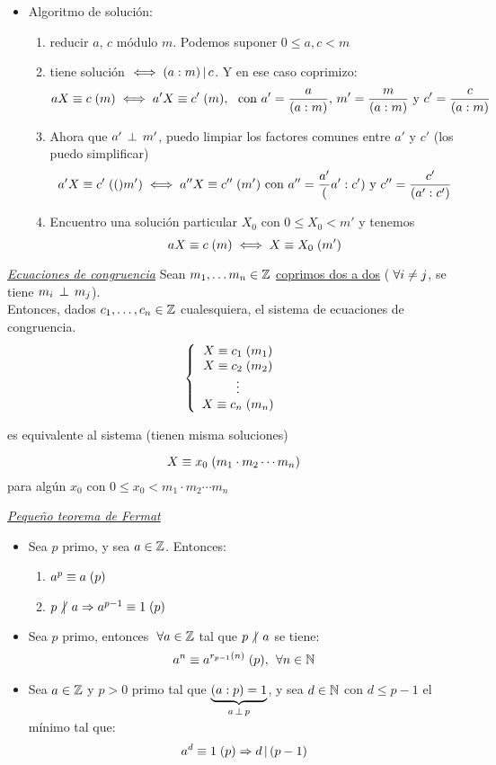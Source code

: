 \begin{itemize}
	\item Algoritmo de solución:
	      \begin{enumerate}[label=\arabic*)]
		      \item reducir $a,\, c$ módulo $m$. Podemos suponer $0 \leq a, c < m$
		      \item tiene solución $\sisolosi (a:m) \divideA c$. Y en ese caso coprimizo:
		            \[
			            \congruencia{aX}{c}{m} \sisolosi \congruencia{a'X}{c'}{m},\ \text{ con } a' = \frac{a}{(a:m)},\, m' = \frac{m}{(a:m)} \text{ y } c' = \frac{c}{(a:m)}
		            \]
		      \item   Ahora que $a' \cop m'$, puedo limpiar los factores comunes entre $a'$ y $c'$ (los puedo simplificar)
		            \[
			            \congruencia{a'X}{c'}(m') \sisolosi \congruencia{a''X}{c''}{m'} \text{ con } a'' = \frac{a'}(a':c') \text{ y } c'' = \frac{c'}{(a':c')}
		            \]
		      \item Encuentro una solución particular $X_0$ con $ 0\leq X_0 < m'$ y tenemos
		            \[
			            \congruencia{aX}{c}{m} \sisolosi \congruencia{X}{X_0}{m'}
		            \]
	      \end{enumerate}

\end{itemize}

\textit\underline{Ecuaciones de congruencia}
Sean $m_1,\dots m_n \en \enteros$ \underline{coprimos dos a dos} ($\paratodo i \distinto j$, se tiene $m_i \cop m_j$). \\
Entonces, dados $c_1,\dots, c_n \en \enteros$ cualesquiera, el sistema de ecuaciones de congruencia.
\[
	\llave{c}{
		\congruencia{X}{c_1}{m_1}\\
		\congruencia{X}{c_2}{m_2}\\
		\vdots\\
		\congruencia{X}{c_n}{m_n}
	}
\]

es equivalente al sistema (tienen misma soluciones)

\[
	\congruencia{X}{x_0}{m_1\cdot m_2 \cdots m_n}
\]
para algún $x_0$ con $0\leq x_0 < m_1\cdot m_2 \cdots m_n$

\textit{\underline{Pequeño teorema de Fermat}}
\begin{itemize}
	\item Sea $p$ primo, y sea $a \en \enteros$. Entonces:
	      \begin{enumerate}[label=\arabic*.)]
		      \item $ \congruencia{a^p}{a}{p} $
		      \item $ p \noDivide a \entonces \congruencia{a^{p-1}}{1}{p} $
	      \end{enumerate}
	\item Sea $p$ primo, entonces $ \paratodo a \en \enteros$ tal que $ p \noDivide a$ se tiene:
	      \[
		      \congruencia{a^n}{a^{r_{p-1}(n)}}{p} ,\, \paratodo n \en \naturales
	      \]
	\item Sea $a \en \enteros$ y $p > 0$ primo tal que $\ub{(a:p) = 1}{a \cop p}$, y sea  $d \en \naturales$ con $d \leq p-1$
	      el mínimo tal que:
	      \[
		      \congruencia{a^d}{1}{p} \entonces d \divideA (p-1)
	      \]
\end{itemize}


